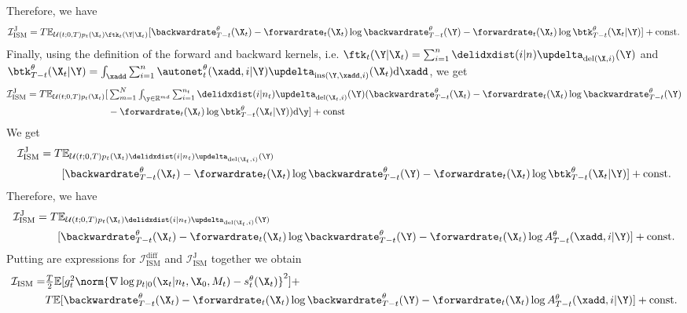 Therefore, we have 
\begin{align}
   \mathcal{I}_{\text{ISM}}^{\text{J}} =  T\mathbb{E}_{\mathcal{U}(t; 0, T) p_t(\X_t) \ftk_t(\Y | \X_t) } [ \backwardrate_{T-t}^\theta(\X_t) - \forwardrate_t(\X_t) \log \backwardrate_{T-t}^\theta(\Y) - \forwardrate_t(\X_t) \log \btk_{T-t}^\theta(\X_t | \Y) ] + \text{const} . 
\end{align}
Finally, using  the definition of the forward and backward kernels, i.e.
$\ftk_t(\Y | \X_t) = \sum_{i=1}^n \delidxdist(i | n) \updelta_{\text{del}(\X,
  i)}(\Y)$ and
$\btk_{T-t}^\theta(\X_t | \Y) = \int_{\xadd} \sum_{i=1}^{n}
\autonet^\theta_t(\xadd, i | \Y) \updelta_{\text{ins}(\Y, \xadd, i)}(\X_t) \rmd
\xadd$, we get
\begin{align}
   \mathcal{I}_{\text{ISM}}^{\text{J}} =  T\mathbb{E}_{\mathcal{U}(t; 0, T) p_t(\X_t) } [&\textstyle  \inty \sum_{i=1}^{n_t} \delidxdist(i | n_t) \updelta_{\text{del}(\X_t, i)}(\Y) ( \backwardrate_{T-t}^\theta(\X_t) - \forwardrate_t(\X_t) \log \backwardrate_{T-t}^\theta(\Y) \\ 
    &\textstyle - \forwardrate_t(\X_t) \log \btk_{T-t}^\theta(\X_t | \Y) ) \rmd \y ] + \text{const} 
\end{align}
We get 
\begin{align}
  \mathcal{I}_{\text{ISM}}^{\text{J}} &=  T\mathbb{E}_{\mathcal{U}(t; 0, T) p_t(\X_t) \delidxdist(i | n_t) \updelta_{\text{del}(\X_t, i)}(\Y) } \\
  & \qquad [\textstyle  \backwardrate_{T-t}^\theta(\X_t) - \forwardrate_t(\X_t) \log \backwardrate_{T-t}^\theta(\Y) - \forwardrate_t(\X_t) \log \btk_{T-t}^\theta(\X_t | \Y) ] + \text{const} . 
\end{align}
Therefore, we have 
\begin{align}
  \mathcal{I}_{\text{ISM}}^{\text{J}} &=  T\mathbb{E}_{\mathcal{U}(t; 0, T) p_t(\X_t) \delidxdist(i | n_t) \updelta_{\text{del}(\X_t, i)}(\Y) } \\
                                      &\qquad [\textstyle  \backwardrate_{T-t}^\theta(\X_t) - \forwardrate_t(\X_t) \log \backwardrate_{T-t}^\theta(\Y) - \forwardrate_t(\X_t) \log A_{T-t}^\theta(\xadd, i | \Y) ] + \text{const} . 
\end{align}
Putting are expressions for $\mathcal{I}_{\text{ISM}}^{\text{diff}}$ and $\mathcal{I}_{\text{ISM}}^{\text{J}}$ together we obtain
\begin{align}
    \mathcal{I}_{\text{ISM}} = &\textstyle \frac{T}{2} \mathbb{E} [g_t^2 \norm{\nabla \log p_{t|0}(\x_t | n_t, \X_0, M_t) - s_t^\theta(\X_t)}^2 ] + \\
    &\textstyle T\mathbb{E} [ \backwardrate_{T-t}^\theta(\X_t) - \forwardrate_t(\X_t) \log \backwardrate_{T-t}^\theta(\Y) - \forwardrate_t(\X_t) \log A_{T-t}^\theta(\xadd, i | \Y) ] + \text{const} . 
\end{align}
